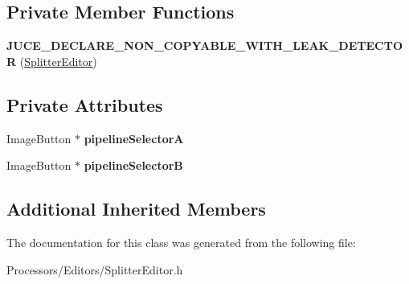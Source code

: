 \subsection*{Private Member Functions}
\begin{DoxyCompactItemize}
\item 
\hypertarget{classSplitterEditor_a0bd85c437886569153ddffee21f0affb}{{\bfseries J\-U\-C\-E\-\_\-\-D\-E\-C\-L\-A\-R\-E\-\_\-\-N\-O\-N\-\_\-\-C\-O\-P\-Y\-A\-B\-L\-E\-\_\-\-W\-I\-T\-H\-\_\-\-L\-E\-A\-K\-\_\-\-D\-E\-T\-E\-C\-T\-O\-R} (\hyperlink{classSplitterEditor}{Splitter\-Editor})}\label{classSplitterEditor_a0bd85c437886569153ddffee21f0affb}

\end{DoxyCompactItemize}
\subsection*{Private Attributes}
\begin{DoxyCompactItemize}
\item 
\hypertarget{classSplitterEditor_a11851bcb7d1c134a663d657e2924b921}{Image\-Button $\ast$ {\bfseries pipeline\-Selector\-A}}\label{classSplitterEditor_a11851bcb7d1c134a663d657e2924b921}

\item 
\hypertarget{classSplitterEditor_a21e5a1c5bde20979a4c8f779598e8cb0}{Image\-Button $\ast$ {\bfseries pipeline\-Selector\-B}}\label{classSplitterEditor_a21e5a1c5bde20979a4c8f779598e8cb0}

\end{DoxyCompactItemize}
\subsection*{Additional Inherited Members}


The documentation for this class was generated from the following file\-:\begin{DoxyCompactItemize}
\item 
Processors/\-Editors/Splitter\-Editor.\-h\end{DoxyCompactItemize}
